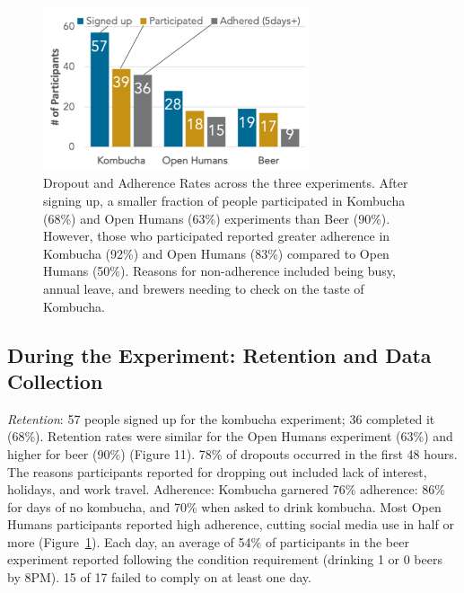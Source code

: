\begin{figure}[h]
\centering
  \includegraphics[width=0.7\textwidth]{figures/galileo/galileo-study3-1}
  \caption[Dropout and Adherence Rates across the three experiments]
{Dropout and Adherence Rates across the three experiments. After signing up, a smaller fraction of people participated in Kombucha (68\%) and Open Humans (63\%) experiments than Beer (90\%). However, those who participated reported greater adherence in Kombucha (92\%) and Open Humans (83\%) compared to Open Humans (50\%). Reasons for non-adherence included being busy, annual leave, and brewers needing to check on the taste of Kombucha. }
  \label{fig:galileo-11-result}
\end{figure}

\subsection{During the Experiment: Retention and Data Collection}
\textit{Retention}: 57 people signed up for the kombucha experiment; 36 completed it (68\%). Retention rates were similar for the Open Humans experiment (63\%) and higher for beer (90\%) (Figure 11). 78\% of dropouts occurred in the first 48 hours. The reasons participants reported for dropping out included lack of interest, holidays, and work travel.
Adherence: Kombucha garnered 76\% adherence: 86\% for days of no kombucha, and 70\% when asked to drink kombucha. Most Open Humans participants reported high adherence, cutting social media use in half or more (Figure~\ref{fig:galileo-11-result}). Each day, an average of 54\% of participants in the beer experiment reported following the condition requirement (drinking 1 or 0 beers by 8PM). 15 of 17 failed to comply on at least one day.

